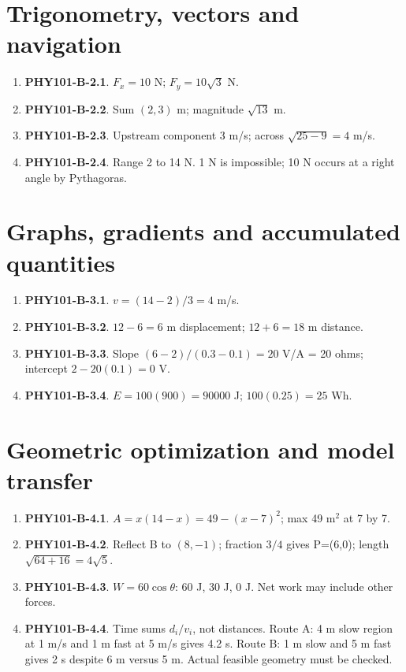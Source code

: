 \documentclass[11pt,a4paper,openany]{book}
\begin{document}
\section{Trigonometry, vectors and navigation}
\begin{enumerate}
\item \textbf{PHY101-B-2.1}. $F_x=10$ N; $F_y=10\sqrt3$ N.
\item \textbf{PHY101-B-2.2}. Sum $(2,3)$ m; magnitude $\sqrt{13}$ m.
\item \textbf{PHY101-B-2.3}. Upstream component 3 m/s; across $\sqrt{25-9}=4$ m/s.
\item \textbf{PHY101-B-2.4}. Range 2 to 14 N. 1 N is impossible; 10 N occurs at a right angle by Pythagoras.
\end{enumerate}
\section{Graphs, gradients and accumulated quantities}
\begin{enumerate}
\item \textbf{PHY101-B-3.1}. $v=(14-2)/3=4$ m/s.
\item \textbf{PHY101-B-3.2}. $12-6=6$ m displacement; $12+6=18$ m distance.
\item \textbf{PHY101-B-3.3}. Slope $(6-2)/(0.3-0.1)=20$ V/A = 20 ohms; intercept $2-20(0.1)=0$ V.
\item \textbf{PHY101-B-3.4}. $E=100(900)=90000$ J; $100(0.25)=25$ Wh.
\end{enumerate}
\section{Geometric optimization and model transfer}
\begin{enumerate}
\item \textbf{PHY101-B-4.1}. $A=x(14-x)=49-(x-7)^2$; max 49 m$^2$ at 7 by 7.
\item \textbf{PHY101-B-4.2}. Reflect B to $(8,-1)$; fraction $3/4$ gives P=(6,0); length $\sqrt{64+16}=4\sqrt5$.
\item \textbf{PHY101-B-4.3}. $W=60\cos\theta$: 60 J, 30 J, 0 J. Net work may include other forces.
\item \textbf{PHY101-B-4.4}. Time sums $d_i/v_i$, not distances. Route A: 4 m slow region at 1 m/s and 1 m fast at 5 m/s gives 4.2 s. Route B: 1 m slow and 5 m fast gives 2 s despite 6 m versus 5 m. Actual feasible geometry must be checked.
\end{enumerate}
\end{document}
